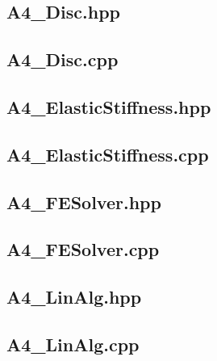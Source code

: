 \documentclass[a4paper, 12pt]{article}
\begin{document}
\newpage
\subsection{A4\_Disc.hpp} \label{subsec:Disc.hpp}


\newpage
\subsection{A4\_Disc.cpp} \label{subsec:Disc.cpp}


\newpage
\subsection{A4\_ElasticStiffness.hpp} \label{subsec:ElasticStiffness.hpp}


\newpage
\subsection{A4\_ElasticStiffness.cpp} \label{subsec:ElasticStiffness.cpp}


\newpage
\subsection{A4\_FESolver.hpp} \label{subsec:FESolver.hpp}


\newpage
\subsection{A4\_FESolver.cpp} \label{subsec:FESolver.cpp}


\newpage
\subsection{A4\_LinAlg.hpp} \label{subsec:LinAlg.hpp}


\newpage
\subsection{A4\_LinAlg.cpp} \label{subsec:LinAlg.cpp}

\end{document}
